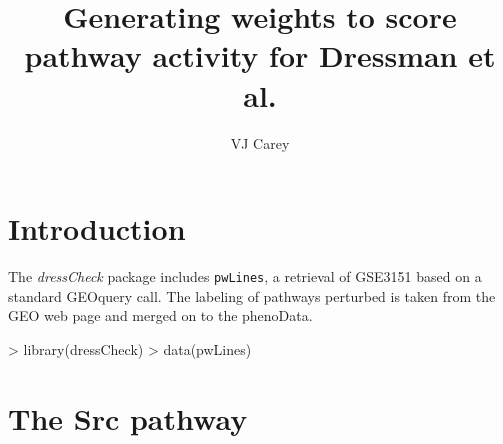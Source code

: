 \documentclass{article}
\begin{document}
\title{Generating weights to score pathway activity for Dressman et al.}
\author{VJ Carey}

\section{Introduction}

The \textit{dressCheck} package includes \texttt{pwLines}, a
retrieval of GSE3151 based on a standard GEOquery call.
The labeling of pathways perturbed is taken from the GEO web
page and merged on to the phenoData.
\begin{Schunk}
\begin{Sinput}
> library(dressCheck)
> data(pwLines)
\end{Sinput}
\end{Schunk}

\section{The Src pathway}
\end{document}
